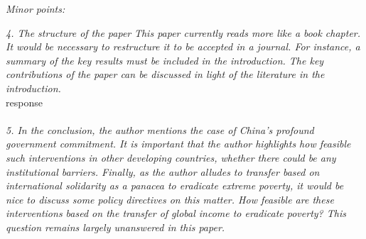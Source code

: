 \documentclass[12pt,english]{article}
\begin{document}
\textit{Minor points:}
 
\textit{4.	The structure of the paper}
\textit{This paper currently reads more like a book chapter. It would be necessary to restructure it to be accepted in a journal. For instance, a summary of the key results must be included in the introduction. The key contributions of the paper can be discussed in light of the literature in the introduction.}~\\

response
~\\ ~\\

\textit{5. In the conclusion, the author mentions the case of China's profound government commitment. It is important that the author highlights how feasible such interventions in other developing countries, whether there could be any institutional barriers. Finally, as the author alludes to transfer based on international solidarity as a panacea to eradicate extreme poverty, it would be nice to discuss some policy directives on this matter. How feasible are these interventions based on the transfer of global income to eradicate poverty? This question remains largely unanswered in this paper.}~\\


~\\ ~\\

\clearpage 
\renewcommand{\url}[1]{\href{#1}{Link}} 
%  
% 
\end{document}
